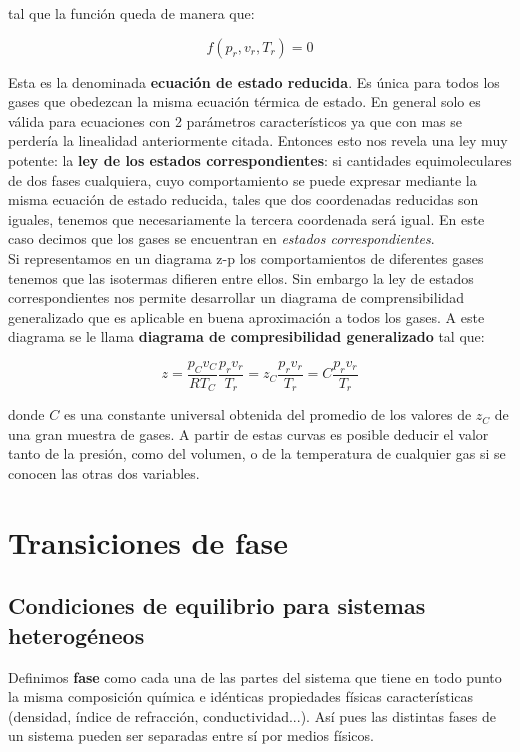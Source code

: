 \documentclass[12pt,a4paper,oneside]{book}
\begin{document}
tal que la función queda de manera que:

\begin{equation}
f(p_r,v_r,T_r) = 0
\end{equation}

Esta es la denominada \textbf{ecuación de estado reducida}. Es única para todos los gases que obedezcan la misma ecuación térmica de estado. En general solo es válida para ecuaciones con 2 parámetros característicos ya que con mas se perdería la linealidad anteriormente citada. Entonces esto nos revela una ley muy potente: la \textbf{ley de los estados correspondientes}: si cantidades equimoleculares de dos fases cualquiera, cuyo comportamiento se puede expresar mediante la misma ecuación de estado reducida, tales que dos coordenadas reducidas son iguales, tenemos que necesariamente la tercera coordenada será igual. En este caso decimos que los gases se encuentran en \textit{estados correspondientes}. \\

Si representamos en un diagrama z-p los comportamientos de diferentes gases tenemos que las isotermas difieren entre ellos. Sin embargo la ley de estados correspondientes nos permite desarrollar un diagrama de comprensibilidad generalizado que es aplicable en buena aproximación a todos los gases. A este diagrama se le llama \textbf{diagrama de compresibilidad generalizado} tal que:

\begin{equation}
z = \dfrac{p_C v_C}{R T_C} \dfrac{p_r v_r}{T_r} = z_C \dfrac{p_r v_r}{T_r} = C \dfrac{p_r v_r}{T_r}
\end{equation}

donde $C$ es una constante universal obtenida del promedio de los valores de $z_C$ de una gran muestra de gases. A partir de estas curvas es posible deducir el valor tanto de la presión, como del volumen, o de la temperatura de cualquier gas si se conocen las otras dos variables.



\chapter{Transiciones de fase}

\section{Condiciones de equilibrio para sistemas heterogéneos}

Definimos \textbf{fase} como cada una de las partes del sistema que tiene en todo punto la misma composición química e idénticas propiedades físicas características (densidad, índice de refracción, conductividad...). Así pues las distintas fases de un sistema pueden ser separadas entre sí por medios físicos.\\
\end{document}
